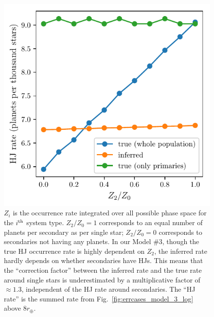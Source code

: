 \begin{figure}[!tb]
    \centering
    \includegraphics[width=.6\textwidth]{figures/HJ_correction_inputrate_vs_HJratevalues.pdf}
    \caption{
        $Z_i$ is the occurrence rate integrated over all possible phase 
        space for the $i^{\rm th}$ system type. $Z_2/Z_0=1$ 
        corresponds to an equal number of planets per secondary as per single 
        star;
        $Z_2/Z_0=0$ corresponds to secondaries not having any 
        planets.
        In our Model \#3, though the true HJ occurrence rate 
        is highly dependent on $Z_2$, 
        the inferred rate hardly depends on whether secondaries have HJs.
        This means that the ``correction factor'' between the inferred rate 
        and the true rate around single stars is underestimated by a 
        multiplicative 
        factor of $\approx1.3$, independent of the HJ rate around secondaries.
        The ``HJ rate'' is the summed rate from     
        Fig.~\ref{fig:errcases_model_3_log} above $8r_\oplus$.
    }
    \label{fig:HJ_correction_inputrate_vs_HJratevalues}
\end{figure}


